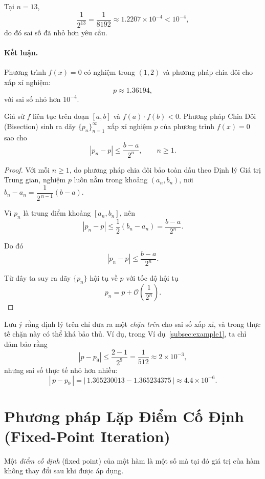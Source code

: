 Tại $n = 13$,
\[
\frac{1}{2^{13}} = \frac{1}{8192} \approx 1.2207\times10^{-4} < 10^{-4},
\]
do đó sai số đã nhỏ hơn yêu cầu.

\paragraph*{Kết luận.}
Phương trình $f(x)=0$ có nghiệm trong $(1,2)$ và phương pháp chia đôi
cho xấp xỉ nghiệm:
\[
p \approx 1.36194,
\]
với sai số nhỏ hơn $10^{-4}$.

\begin{theorem}
\label{thm:bisection_convergence}
Giả sử $f$ liên tục trên đoạn $[a,b]$ và $f(a)\cdot f(b) < 0$. Phương pháp Chia Đôi
(Bisection) sinh ra dãy $\{p_n\}_{n=1}^{\infty}$ xấp xỉ nghiệm $p$ của phương trình
$f(x)=0$ sao cho
\[
|p_n - p| \le \frac{b - a}{2^n}, \qquad n \ge 1.
\]
\end{theorem}

\begin{proof}
Với mỗi $n \ge 1$, do phương pháp chia đôi bảo toàn dấu theo Định lý Giá trị Trung gian,
nghiệm $p$ luôn nằm trong khoảng $(a_n,b_n)$, nơi $b_n - a_n = \dfrac{1}{2^{\,n-1}}(b-a)$.

Vì $p_n$ là trung điểm khoảng $[a_n,b_n]$, nên
\[
|p_n - p| \le \frac{1}{2}(b_n - a_n) = \frac{b-a}{2^n}.
\]

Do đó
\[
|p_{n} - p| \le \frac{b-a}{2^n}.
\]

Từ đây ta suy ra dãy $\{p_n\}$ hội tụ về $p$ với tốc độ hội tụ
\[
p_n = p + \mathcal{O}\!\left(\frac{1}{2^n}\right).
\]
\end{proof}

\noindent
Lưu ý rằng định lý trên chỉ đưa ra một \emph{chặn trên} cho sai số xấp xỉ,
và trong thực tế chặn này có thể khá bảo thủ. Ví dụ, trong
Ví dụ~\ref{subsec:example1}, ta chỉ đảm bảo rằng
\[
|p - p_{9}| \le \frac{2-1}{2^9} = \frac{1}{512} \approx 2\times 10^{-3},
\]
nhưng sai số thực tế nhỏ hơn nhiều:
\[
|\,p - p_{9}\,| = |\,1.365230013 - 1.365234375\,|
    \approx 4.4\times 10^{-6}.
\]










\section{Phương pháp Lặp Điểm Cố Định (Fixed-Point Iteration)}
\label{sec:fixed_point_iteration}

Một \emph{điểm cố định} (fixed point) của một hàm là một số mà tại đó
giá trị của hàm không thay đổi sau khi được áp dụng.

